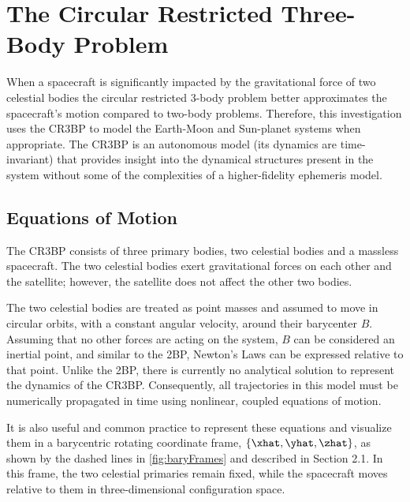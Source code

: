 \section{The Circular Restricted Three-Body Problem}
When a spacecraft is significantly impacted by the gravitational force of two celestial bodies the
circular restricted 3-body problem better approximates the spacecraft's motion compared to two-body
problems. Therefore, this investigation uses the CR3BP to model the Earth-Moon and Sun-planet
systems when appropriate. The CR3BP is an autonomous model (its dynamics are time-invariant) that
provides insight into the dynamical structures present in the system without some of the
complexities of a higher-fidelity ephemeris model.

\subsection{Equations of Motion}
The CR3BP consists of three primary bodies, two celestial bodies and a massless spacecraft. The two
celestial bodies exert gravitational forces on each other and the satellite; however, the satellite
does not affect the other two bodies. 

The two celestial bodies are treated as point masses and assumed to move in circular orbits, with a
constant angular velocity, around their barycenter $B$. Assuming that no other forces are acting on
the system, $B$ can be considered an inertial point, and similar to the 2BP, Newton's Laws can be
expressed relative to that point. Unlike the 2BP, there is currently no analytical solution to
represent the dynamics of the CR3BP. Consequently, all trajectories in this model must be
numerically propagated in time using nonlinear, coupled equations of motion.

It is also useful and common practice to represent these equations and visualize them in a
barycentric rotating coordinate frame, $\{\xhat,\yhat,\zhat\}$, as shown by the dashed lines in
\cref{fig:baryFrames} and described in Section 2.1. In this frame, the two celestial primaries
remain fixed, while the spacecraft moves relative to them in three-dimensional configuration space.


